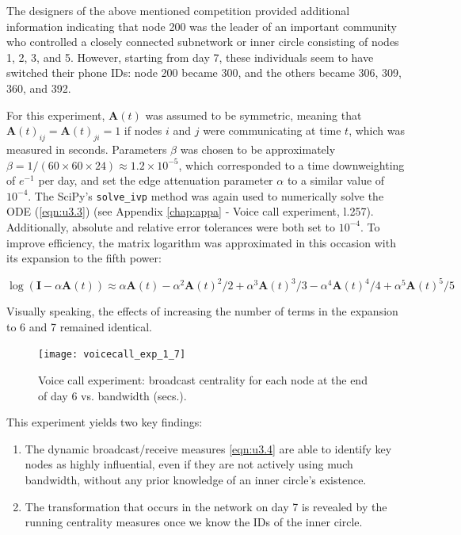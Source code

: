 The designers of the above mentioned competition provided additional information indicating that node 200 was the leader of an important community who controlled a closely connected subnetwork or inner circle consisting of nodes 1, 2, 3, and 5. However, starting from day 7, these individuals seem to have switched their phone IDs: node 200 became 300, and the others became 306, 309, 360, and 392.

For this experiment, $\mathbf{A}(t)$ was assumed to be symmetric, meaning that $\mathbf{A}(t)_{ij} = \mathbf{A}(t)_{ji} = 1$ if nodes $i$ and $j$ were communicating at time $t$, which was measured in seconds. Parameters $\beta$ was chosen to be approximately $\beta = 1/(60\times 60 \times 24) \approx 1.2 \times 10^{-5}$, which corresponded to a time downweighting of $e^{-1}$ per day, and set the edge attenuation parameter $\alpha$ to a similar value of $10^{-4}$. The SciPy's \texttt{solve\_ivp} method was again used to numerically solve the ODE (\ref{eqn:u3.3}) (see Appendix \ref{chap:appa} - Voice call experiment, l.257). Additionally, absolute and relative error tolerances were both set to $10^{-4}$. To improve efficiency, the matrix logarithm was approximated in this occasion with its expansion to the fifth power:

$$\log(\mathbf{I} - \alpha \mathbf{A}(t)) \approx \alpha \mathbf{A}(t) - \alpha^2 \mathbf{A}(t)^2/2 + \alpha^3 \mathbf{A}(t)^3/3 - \alpha^4 \mathbf{A}(t)^4/4 + \alpha^5 \mathbf{A}(t)^5/5$$ 

Visually speaking, the effects of increasing the number of terms in the expansion to 6 and 7 remained identical.

\begin{figure}[h]\centering
    \texttt{[image: voicecall\_exp\_1\_7]}
    \caption{Voice call experiment: broadcast centrality for each node at the end of day 6 vs. bandwidth (secs.).}
    \label{fig:ve1a}
    \bigskip
\end{figure}

This experiment yields two key findings:
\begin{enumerate}[label=(\roman*)]
  \item The dynamic broadcast/receive measures \eqref{eqn:u3.4} are able to identify key nodes as highly influential, even if they are not actively using much bandwidth, without any prior knowledge of an inner circle's existence.
  \item The transformation that occurs in the network on day 7 is revealed by the running centrality measures once we know the IDs of the inner circle.
\end{enumerate}

